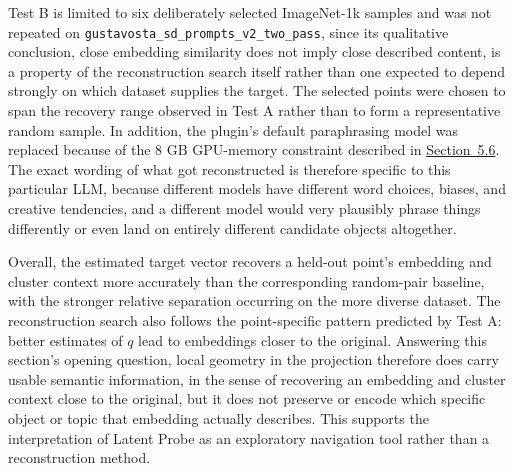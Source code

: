 Test B is limited to six deliberately selected ImageNet-1k samples and was not repeated on \texttt{gustavosta\_sd\_prompts\_v2\_two\_pass}, since its qualitative conclusion, close embedding similarity does not imply close described content, is a property of the reconstruction search itself rather than one expected to depend strongly on which dataset supplies the target. The selected points were chosen to span the recovery range observed in Test A rather than to form a representative random sample. In addition, the plugin's default paraphrasing model was replaced because of the 8 GB GPU-memory constraint described in \hyperref[sec:5.6]{Section~5.6}. The exact wording of what got reconstructed is therefore specific to this particular LLM, because different models have different word choices, biases, and creative tendencies, and a different model would very plausibly phrase things differently or even land on entirely different candidate objects altogether.

Overall, the estimated target vector recovers a held-out point's embedding and cluster context more accurately than the corresponding random-pair baseline, with the stronger relative separation occurring on the more diverse dataset. The reconstruction search also follows the point-specific pattern predicted by Test A: better estimates of $q$ lead to embeddings closer to the original. Answering this section's opening question, local geometry in the projection therefore does carry usable semantic information, in the sense of recovering an embedding and cluster context close to the original, but it does not preserve or encode which specific object or topic that embedding actually describes. This supports the interpretation of Latent Probe as an exploratory navigation tool rather than a reconstruction method.
